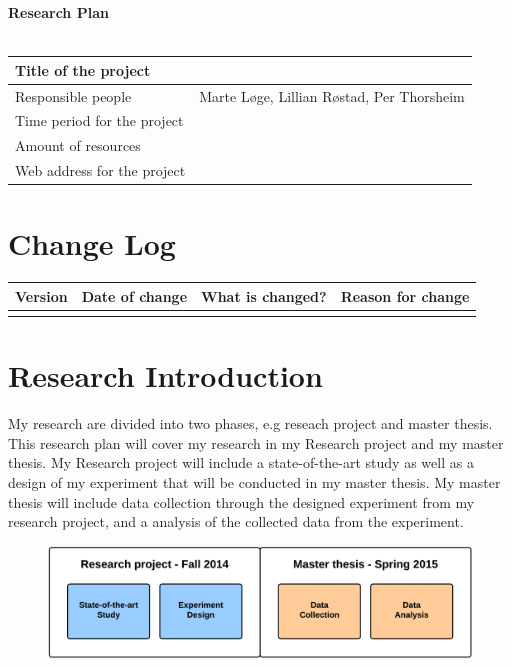 
{\bf \Huge Research Plan} \\[0.5cm]

\noindent\makebox[\linewidth]{\rule{\textwidth}{1pt}} \\

  \begin{tabular}{| l | l |}
    \hline
    Title of the project & \\ \hline
    Responsible people & Marte Løge, Lillian Røstad, Per Thorsheim\\ \hline
    Time period for the project & \\ \hline
    Amount of resources & \\ \hline
    Web address for the project & \\ \hline
  \end{tabular}

  \section*{Change Log}

    \begin{tabular}{| l | l | l | l |}
    \hline
      {\bf Version} & {\bf Date of change} & {\bf What is changed?} & {\bf Reason for change} \\ \hline
       & & &  \\ \hline
    \end{tabular}

  \section*{Research Introduction}

  My research are divided into two phases, e.g reseach project and master thesis. This research plan will cover my research in my Research project and my master thesis. My Research project will include a state-of-the-art study as well as a design of my experiment that will be conducted in my master thesis. 
  My master thesis will include data collection through the designed experiment from my research project, and a analysis of the collected data from the experiment. 

  \begin{figure}[H]
    \centering
    \includegraphics[width=\textwidth]{ResearchPlan1.png}
  \end{figure}

